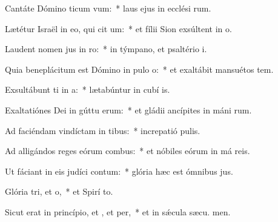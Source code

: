 \item Cantáte Dómino ticum vum:~* laus ejus in ecclési rum.
\item Lætétur Israël in eo, qui cit um:~* et fílii Sion exsúltent in  o.
\item Laudent nomen jus in ro:~* in týmpano, et psaltério  i.
\item Quia beneplácitum est Dómino in pulo o:~* et exaltábit mansuétos  tem.
\item Exsultábunt ti in a:~* lætabúntur in cubí is.
\item Exaltatiónes Dei in gúttu erum:~* et gládii ancípites in máni rum.
\item Ad faciéndam vindíctam in tibus:~* increpatió  pulis.
\item Ad alligándos reges eórum  combus:~* et nóbiles eórum in má reis.
\item Ut fáciant in eis judíci contum:~* glória hæc est ómnibus  jus.
\item Glória tri, et o,~* et Spirí to.
\item Sicut erat in princípio, et , et per,~* et in sǽcula sæcu. men.
